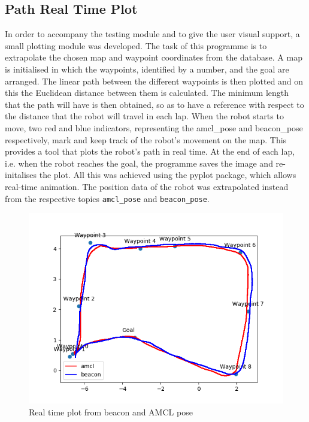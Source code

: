 \subsection{Path Real Time Plot}
In order to accompany the testing module and to give the user visual support, a small plotting module was developed. The task of this programme is to extrapolate the chosen map and waypoint coordinates from the database. A map is initialised in which the waypoints, identified by a number, and the goal are arranged. The linear path between the different waypoints is then plotted and on this the Euclidean distance between them is calculated. The minimum length that the path will have is then obtained, so as to have a reference with respect to the distance that the robot will travel in each lap. When the robot starts to move, two red and blue indicators, representing the amcl\_pose and beacon\_pose respectively, mark and keep track of the robot's movement on the map. This provides a tool that plots the robot's path in real time. At the end of each lap, i.e. when the robot reaches the goal, the programme saves the image and re-initalises the plot. All this was achieved using the pyplot package, which allows real-time animation. The position data of the robot was extrapolated instead from the respective topics \texttt{amcl\_pose} and \texttt{beacon\_pose}.
\begin{figure}[H]
    \centering
    \includegraphics[scale=0.67]{Images/Chapter 5/plot_amclvsbeacon.png}
    \caption{Real time plot from beacon and AMCL pose }
    \label{fig:realtimeplot}
\end{figure}


